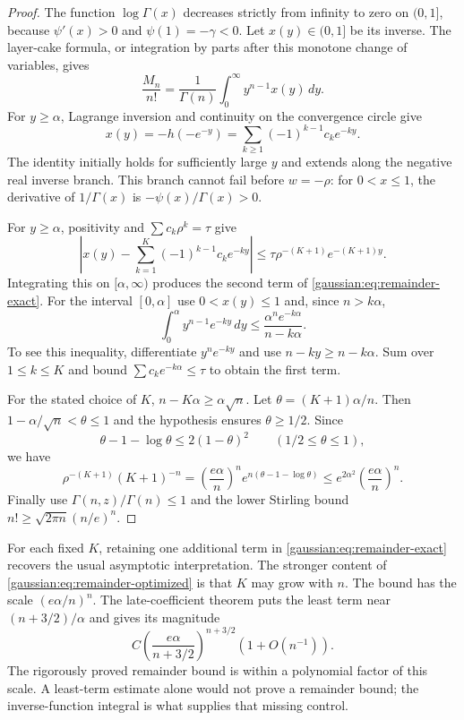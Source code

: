 \begin{proof}
The function $\log\Gamma(x)$ decreases strictly from infinity to zero on
$(0,1]$, because $\psi'(x)>0$ and $\psi(1)=-\gamma<0$.
Let $x(y)\in(0,1]$ be its inverse.  The layer-cake formula, or integration
by parts after this monotone change of variables, gives
\begin{equation}
 \frac{M_n}{n!}=\frac1{\Gamma(n)}\int_0^\infty y^{n-1}x(y)\,dy.
 \label{gaussian:eq:moment-inverse}
\end{equation}
For $y\ge\alpha$, Lagrange inversion and continuity on the convergence
circle give
\[
 x(y)=-h(-e^{-y})=\sum_{k\ge1}(-1)^{k-1}c_ke^{-ky}.
\]
The identity initially holds for sufficiently large $y$ and extends along
the negative real inverse branch.  This branch cannot fail before
$w=-\rho$: for $0<x\le1$, the derivative of $1/\Gamma(x)$ is
$-\psi(x)/\Gamma(x)>0$.

For $y\ge\alpha$, positivity and $\sum c_k\rho^k=\tau$ give
\[
 \left|x(y)-\sum_{k=1}^{K}(-1)^{k-1}c_ke^{-ky}\right|
 \le\tau\rho^{-(K+1)}e^{-(K+1)y}.
\]
Integrating this on $[\alpha,\infty)$ produces the second term of
\eqref{gaussian:eq:remainder-exact}.
For the interval $[0,\alpha]$ use $0<x(y)\le1$ and, since $n>k\alpha$,
\[
 \int_0^\alpha y^{n-1}e^{-ky}\,dy
 \le\frac{\alpha^n e^{-k\alpha}}{n-k\alpha}.
\]
To see this inequality, differentiate $y^ne^{-ky}$ and use
$n-ky\ge n-k\alpha$.  Sum over $1\le k\le K$ and bound
$\sum c_ke^{-k\alpha}\le\tau$ to obtain the first term.

For the stated choice of $K$, $n-K\alpha\ge\alpha\sqrt n$.
Let $\theta=(K+1)\alpha/n$.  Then
$1-\alpha/\sqrt n<\theta\le1$ and the hypothesis ensures $\theta\ge1/2$.
Since
\[
 \theta-1-\log\theta\le2(1-\theta)^2\qquad(1/2\le\theta\le1),
\]
we have
\[
 \rho^{-(K+1)}(K+1)^{-n}
 =\left(\frac{e\alpha}{n}\right)^n
   e^{n(\theta-1-\log\theta)}
 \le e^{2\alpha^2}\left(\frac{e\alpha}{n}\right)^n.
\]
Finally use $\Gamma(n,z)/\Gamma(n)\le1$ and the lower Stirling bound
$n!\ge\sqrt{2\pi n}(n/e)^n$.
\end{proof}

For each fixed $K$, retaining one additional term in
\eqref{gaussian:eq:remainder-exact} recovers the usual asymptotic interpretation.
The stronger content of \eqref{gaussian:eq:remainder-optimized} is that $K$ may grow
with $n$.  The bound has the scale $(e\alpha/n)^n$.
The late-coefficient theorem puts the least term near
$(n+3/2)/\alpha$ and gives its magnitude
\[
 C\left(\frac{e\alpha}{n+3/2}\right)^{n+3/2}(1+O(n^{-1})).
\]
The rigorously proved remainder bound is within a polynomial factor of
this scale.  A least-term estimate alone would not prove a remainder bound;
the inverse-function integral is what supplies that missing control.

